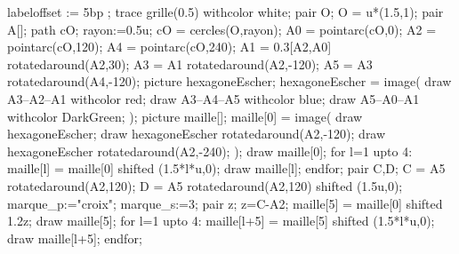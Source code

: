 \begin{exercice*}
\begin{changemargin}{0mm}{-5mm}
\begin{enumerate}
\begin{itemize}
            \end{itemize}
            \begin{Geometrie}[CoinHD={(9u,4u)}]
                labeloffset := 5bp ;
                trace grille(0.5) withcolor white;
                pair O;
                O = u*(1.5,1);
                pair A[];
                path cO;
                rayon:=0.5u;
                cO = cercles(O,rayon);
                A0 = pointarc(cO,0);
                A2 = pointarc(cO,120);
                A4 = pointarc(cO,240);
                A1 = 0.3[A2,A0] rotatedaround(A2,30);
                A3 = A1 rotatedaround(A2,-120);
                A5 = A3 rotatedaround(A4,-120);        
                picture hexagoneEscher;
                hexagoneEscher = image(
                    draw A3--A2--A1 withcolor red;        
                        draw A3--A4--A5 withcolor blue;        
                        draw A5--A0--A1 withcolor DarkGreen;
                );
                picture maille[];
                maille[0] = image(
                    draw hexagoneEscher;
                    draw hexagoneEscher rotatedaround(A2,-120);
                    draw hexagoneEscher rotatedaround(A2,-240);
                );        
                draw maille[0];
                for l=1 upto 4:
                    maille[l] = maille[0] shifted (1.5*l*u,0);
                    draw maille[l];
                endfor;
                pair C,D;
                C = A5 rotatedaround(A2,120);
                D = A5 rotatedaround(A2,120) shifted (1.5u,0);
                marque_p:="croix";
                marque_s:=3;
                pair z;
                z=C-A2;
                maille[5] = maille[0] shifted 1.2z;
                draw maille[5];
                for l=1 upto 4:
                    maille[l+5] = maille[5] shifted (1.5*l*u,0);
                        draw maille[l+5];
                endfor;            
            \end{Geometrie}
        \end{enumerate}
    \end{changemargin}
\end{exercice*}
